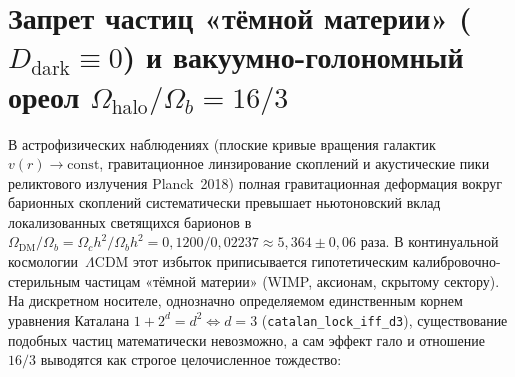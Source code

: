 \section{Запрет частиц «тёмной материи» (\texorpdfstring{$D_{\mathrm{dark}} \equiv 0$}{D\_dark = 0}) и вакуумно-голономный ореол \texorpdfstring{$\Omega_{\mathrm{halo}}/\Omega_b = 16/3$}{16/3}}
\label{sec:cosmo-dark-matter-ratio}

В астрофизических наблюдениях (плоские кривые вращения галактик $v(r)\to\mathrm{const}$, гравитационное линзирование скоплений и акустические пики реликтового излучения Planck~2018) полная гравитационная деформация вокруг барионных скоплений систематически превышает ньютоновский вклад локализованных светящихся барионов в $\Omega_{\mathrm{DM}}/\Omega_b = \Omega_c h^2 / \Omega_b h^2 = 0{,}1200 / 0{,}02237 \approx 5{,}364 \pm 0{,}06$ раза.
В континуальной космологии~$\Lambda\mathrm{CDM}$ этот избыток приписывается гипотетическим калибровочно-стерильным частицам «тёмной материи» (WIMP, аксионам, скрытому сектору).
На дискретном носителе, однозначно определяемом единственным корнем уравнения Каталана $1+2^d=d^2 \iff d=3$ (\texttt{catalan\_\allowbreak lock\_\allowbreak iff\_\allowbreak d3}), существование подобных частиц математически невозможно, а сам эффект гало и отношение $16/3$ выводятся как строгое целочисленное тождество:

